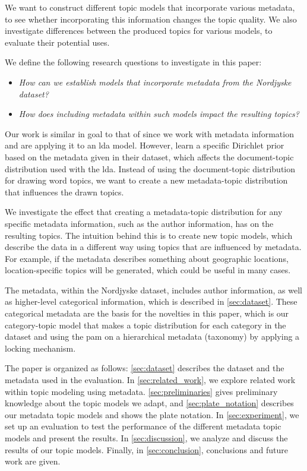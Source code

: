 We want to construct different topic models that incorporate various metadata, to see whether incorporating this information changes the topic quality. 
We also investigate differences between the produced topics for various models, to evaluate their potential uses.

We define the following research questions to investigate in this paper:

\begin{itemize}
	\item \textit{How can we establish models that incorporate metadata from the Nordjyske dataset?}
	\item \textit{How does including metadata within such models impact the resulting topics?}
\end{itemize}

Our work is similar in goal to that of \citet{MetaLDA2017} since we work with metadata information and are applying it to an \gls{lda} model.
However, \citet{MetaLDA2017} learn a specific Dirichlet prior based on the metadata given in their dataset, which affects the document-topic distribution used with the \gls{lda}.
Instead of using the document-topic distribution for drawing word topics, we want to create a new metadata-topic distribution that influences the drawn topics.

We investigate the effect that creating a metadata-topic distribution for any specific metadata information, such as the author information, has on the resulting topics.
The intuition behind this is to create new topic models, which describe the data in a different way using topics that are influenced by metadata.
For example, if the metadata describes something about geographic locations, location-specific topics will be generated, which could be useful in many cases.

The metadata, within the Nordjyske dataset, includes author information, as well as higher-level categorical information, which is described in \autoref{sec:dataset}.
These categorical metadata are the basis for the novelties in this paper, which is our category-topic model that makes a topic distribution for each category in the dataset and using the \gls{pam} on a hierarchical metadata (taxonomy) by applying a locking mechanism.

The paper is organized as follows:
\autoref{sec:dataset} describes the dataset and the metadata used in the evaluation.
In \autoref{sec:related_work}, we explore related work within topic modeling using metadata.
\autoref{sec:preliminaries} gives preliminary knowledge about the topic models we adapt, and \autoref{sec:plate_notation} describes our metadata topic models and shows the plate notation.
In \autoref{sec:experiment}, we set up an evaluation to test the performance of the different metadata topic models and present the results.
In \autoref{sec:discussion}, we analyze and discuss the results of our topic models.
Finally, in \autoref{sec:conclusion}, conclusions and future work are given.
